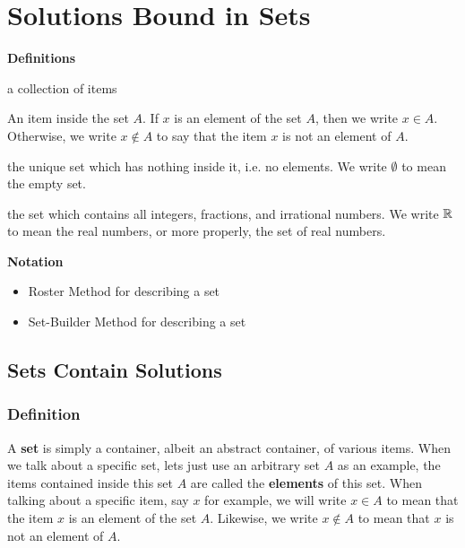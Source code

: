 \chapter{Solutions Bound in Sets}\label{chap:numAndSets}
\begin{genericFrame}[frametitle={~New Things\hbox{~}}]
    \textbf{\Large\sffamily Definitions}
    \begin{description}[style=nextline]
        \item[Set] a collection of items
        \item[Element of set \(A\)] An item inside the set \(A\). If
         \(x\) is an element of the set \(A\), then we write
         \(x\in A\). Otherwise, we write \(x\notin A\) to say that the
         item \(x\) is not an element of \(A\).
        \item[Empty Set] the unique set which has nothing inside it,
         i.e. no elements. We write \(\emptyset\) to mean the empty 
         set.
        \item[Real Numbers] the set which contains all integers,
         fractions, and irrational numbers. We write \(\mathbb{R}\) to
         mean the real numbers, or more properly, the set of real
         numbers.
    \end{description}
    \textbf{\Large\sffamily Notation}
    \begin{itemize}
        \item Roster Method for describing a set
        \item Set-Builder Method for describing a set
    \end{itemize}
\end{genericFrame}

\section{Sets Contain Solutions}
\subsection{Definition}\label{sec:set_defn}
A \textbf{set} is simply a container, albeit an abstract container, of 
various items. When we talk about a specific set, lets just use an 
arbitrary set \(A\) as an example, the items contained inside this set 
\(A\) are called the \textbf{elements} of this set. When talking about 
a specific item, say \(x\) for example, we will write \(x\in A\) to 
mean that the item \(x\) is an element of the set \(A\). Likewise, we 
write \(x\notin A\) to mean that \(x\) is not an element of \(A\).

